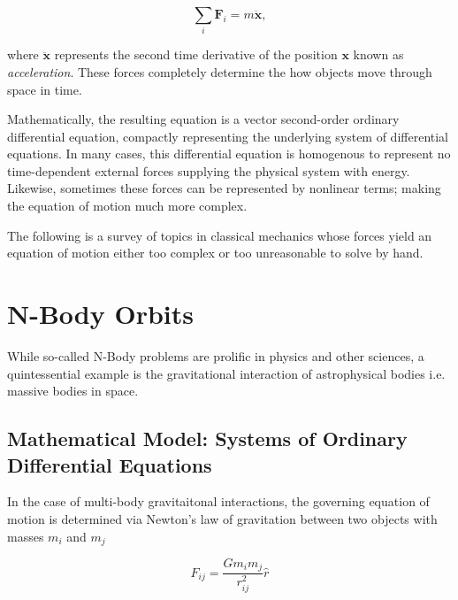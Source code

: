 \documentclass{report}
\begin{document}
    \begin{equation} \label{eq:newton}
        \sum_i \mathbf{F}_i = m \ddot{\mathbf{x}},
    \end{equation}

    where $\ddot{\mathbf{x}}$ represents the second time derivative of the position $\mathbf{x}$ known as \emph{acceleration}.  These forces completely determine the how objects move through space in time.
    
    Mathematically, the resulting equation is a vector second-order ordinary differential equation, compactly representing the underlying system of differential equations.  In many cases, this differential equation is homogenous to represent no time-dependent external forces supplying the physical system with energy.  Likewise, sometimes these forces can be represented by nonlinear terms; making the equation of motion much more complex.
    
    The following is a survey of topics in classical mechanics whose forces yield an equation of motion either too complex or too unreasonable to solve by hand.

\pagebreak

    \section{N-Body Orbits} \label{subsec:orbits}

        While so-called N-Body problems are prolific in physics and other sciences, a quintessential example is the gravitational interaction of astrophysical bodies i.e. massive bodies in space.

        \subsection{Mathematical Model: Systems of Ordinary Differential Equations}

            In the case of multi-body gravitaitonal interactions, the governing equation of motion is determined via Newton's law of gravitation between two objects with masses $m_i$ and $m_j$

            \begin{equation}
                F_{ij} = \frac{G m_i m_j}{r_{ij}^2} \hat{r}
            \end{equation}
\end{document}
